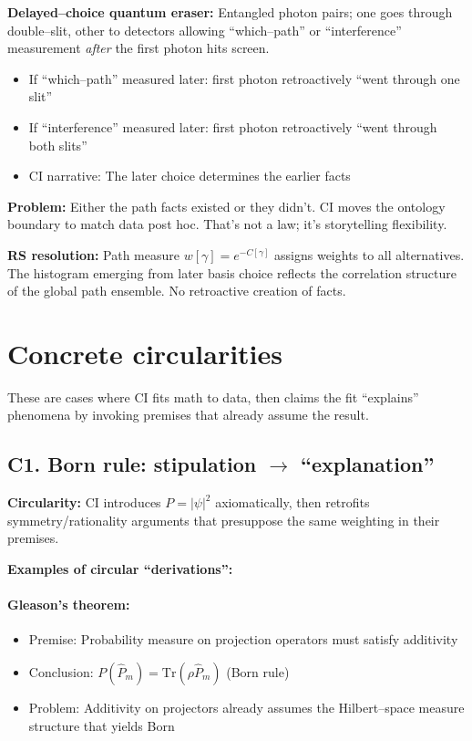 \documentclass[11pt]{article}
\begin{document}
\textbf{Delayed--choice quantum eraser:}
Entangled photon pairs; one goes through double--slit, other to detectors allowing ``which--path'' or ``interference'' measurement \emph{after} the first photon hits screen.

\begin{itemize}[nosep]
  \item If ``which--path'' measured later: first photon retroactively ``went through one slit''
  \item If ``interference'' measured later: first photon retroactively ``went through both slits''
  \item CI narrative: The later choice determines the earlier facts
\end{itemize}

\textbf{Problem:} Either the path facts existed or they didn't. CI moves the ontology boundary to match data post hoc. That's not a law; it's storytelling flexibility.

\textbf{RS resolution:} Path measure $w[\gamma]=e^{-C[\gamma]}$ assigns weights to all alternatives. The histogram emerging from later basis choice reflects the correlation structure of the global path ensemble. No retroactive creation of facts.

\section{Concrete circularities}\label{sec:born_circular}

These are cases where CI fits math to data, then claims the fit ``explains'' phenomena by invoking premises that already assume the result.

\subsection{C1. Born rule: stipulation $\to$ ``explanation''}

\begin{warnbox}
\textbf{Circularity:} CI introduces $P=|\psi|^2$ axiomatically, then retrofits symmetry/rationality arguments that presuppose the same weighting in their premises.
\end{warnbox}

\textbf{Examples of circular ``derivations'':}

\paragraph{Gleason's theorem:}
\begin{itemize}[nosep]
  \item Premise: Probability measure on projection operators must satisfy additivity
  \item Conclusion: $P(\hat P_m)=\text{Tr}(\rho \hat P_m)$ (Born rule)
  \item Problem: Additivity on projectors already assumes the Hilbert--space measure structure that yields Born
\end{itemize}
\end{document}
